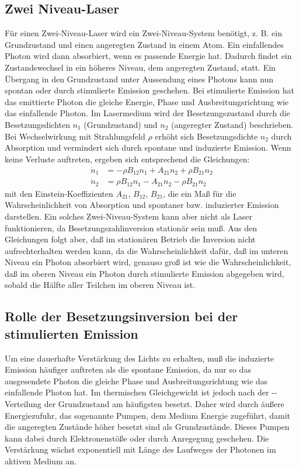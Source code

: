 \subsection{Zwei Niveau-Laser}
Für einen Zwei-Niveau-Laser wird ein Zwei-Niveau-System benötigt,
z. B. ein Grundzustand und einen angeregten Zustand in einem Atom.  Ein
einfallendes Photon wird dann absorbiert, wenn es passende Energie hat.
Dadurch findet ein Zustandswechsel in ein höheres Niveau, dem angeregten
Zustand, statt.  Ein Übergang in den Grundzustand unter Aussendung eines
Photons kann nun spontan oder durch stimulierte Emission geschehen.  Bei
stimulierte Emission hat das emittierte Photon die gleiche Energie,
Phase und Ausbreitungsrichtung wie das einfallende Photon. Im
Lasermedium wird der Besetzungszustand durch die Besetzungsdichten $n_1$
(Grundzustand) und $n_2$ (angeregter Zustand) beschrieben.  Bei
Wechselwirkung mit Strahlungsfeld $\rho$ erhöht sich Besetzungsdichte
$n_2$ durch Absorption und vermindert sich durch spontane und induzierte
Emission.  Wenn keine Verluste auftreten, ergeben sich entsprechend die
Gleichungen:
\begin{align}
  \dot{n}_1 &= -\rho B_{12} n_1 + A_{21} n_2 + \rho B_{21} n_2\\
  \dot{n}_2 &=  \rho B_{12} n_1 - A_{21} n_2 - \rho B_{21} n_2
\end{align}
mit den Einstein-Koeffizienten $A_{21}$, $B_{12}$, $B_{21}$, die ein Maß
für die Wahrscheinlichkeit von Absorption und spontaner bzw. induzierter
Emission darstellen.  Ein solches Zwei-Niveau-System kann aber nicht als
Laser funktionieren, da Besetzungszahlinversion stationär sein muß.  Aus
den Gleichungen folgt aber, daß im stationären Betrieb die Inversion
nicht aufrechterhalten werden kann, da die Wahrscheinlichkeit dafür, daß
im unteren Niveau ein Photon absorbiert wird, genauso groß ist wie die
Wahrscheinlichkeit, daß im oberen Niveau ein Photon durch stimulierte
Emission abgegeben wird, sobald die Hälfte aller Teilchen im oberen
Niveau ist.

\subsection{Rolle der Besetzungsinversion bei der stimulierten Emission}
Um eine dauerhafte Verstärkung des Lichts zu erhalten, muß die
induzierte Emission häufiger auftreten als die spontane Emission, da nur
so das ausgesendete Photon die gleiche Phase und Ausbreitungsrichtung
wie das einfallende Photon hat.  Im thermischen Gleichgewicht ist jedoch
nach der --Verteilung der Grundzustand am
häufigsten besetzt.  Daher wird durch äußere Energiezufuhr, das
sogenannte Pumpen, dem Medium Energie zugeführt, damit die angeregten
Zustände höher besetzt sind als Grundzustände.  Dieses Pumpen kann dabei
durch Elektronenstöße oder durch Anregegung geschehen.  Die Verstärkung
wächst exponentiell mit Länge des Laufweges der Photonen im aktiven
Medium an.

